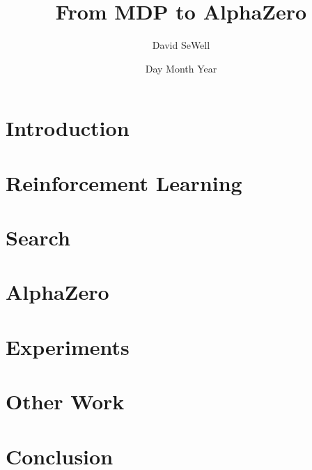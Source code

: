 \documentclass[12pt]{report}
\title{From MDP to AlphaZero}
\author{David SeWell}
\date{Day Month Year}
\begin{document}




 


\tableofcontents
{}

\chapter{Introduction}


\chapter{Reinforcement Learning}


\chapter{Search}


\chapter{AlphaZero}


\chapter{Experiments}


\chapter{Other Work}


\chapter{Conclusion}


\listoffigures

\printbibliography
\end{document}
